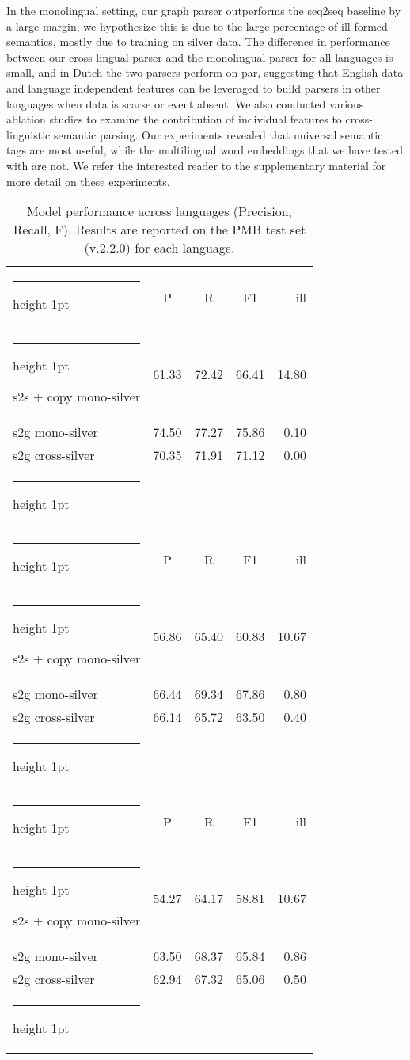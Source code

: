 \documentclass[11pt,a4paper]{article}
\makeatletter
\theoremstyle{plain}
\newcommand{\thickhline}{\noalign {\ifnum 0=`}\fi \hrule height 1pt
    \futurelet \reserved@a \@xhline
}
\makeatother
\begin{document}
In the monolingual setting, our graph parser outperforms the seq2seq
baseline by a large margin; we hypothesize this is due to the large
percentage of ill-formed semantics, mostly due to training on silver
data. The difference in performance between our cross-lingual parser and the
monolingual parser for all languages is small, and in Dutch the two parsers perform on par, suggesting that English data
and language independent features can be leveraged to build parsers in
other languages when data is scarse or event absent. We also conducted
various ablation studies to examine the contribution of individual
features to cross-linguistic semantic parsing. Our experiments
revealed that universal semantic tags are most useful, while
the multilingual word embeddings that we have tested with are not. We refer the interested reader to the supplementary material for more detail on these experiments.

\begin{table}[t]
\begin{center}
\begin{small}  

  \begin{tabular}{@{}lcccr@{}}         \thickhline
\multicolumn{1}{c}{\emph{Italian}}           & P & R & F1 & ill \\         \thickhline
s2s + copy mono-silver & 61.33 & 72.42 & 66.41 & 14.80 \\
s2g mono-silver & 74.50 & 77.27 & 75.86 & 0.10 \\
s2g cross-silver & 70.35 & 71.91 & 71.12 & 0.00 \\\thickhline
\multicolumn{4}{c}{} \\\thickhline
\multicolumn{1}{c}{\emph{German}}           & P & R & F1 & ill \\         \thickhline
s2s + copy mono-silver& 56.86 & 65.40 & 60.83 & 10.67 \\
s2g mono-silver& 66.44 & 69.34 & 67.86 & 0.80 \\
s2g cross-silver& 66.14 & 65.72 & 63.50 & 0.40 \\\thickhline
\multicolumn{4}{c}{} \\\thickhline
\multicolumn{1}{c}{\emph{Dutch}}           & P & R & F1 & ill \\         \thickhline
s2s + copy mono-silver& 54.27 & 64.17 & 58.81 & 10.67\\
s2g mono-silver& 63.50 & 68.37 & 65.84 & 0.86\\
s2g cross-silver& 62.94 & 67.32 & 65.06 & 0.50\\\thickhline
    \end{tabular}
\end{small}
\end{center}
\caption{Model performance across languages (Precision, Recall,
  F). Results are reported on the PMB test set (v.2.2.0) for each language.}
\label{monoother}
\end{table}
\end{document}
